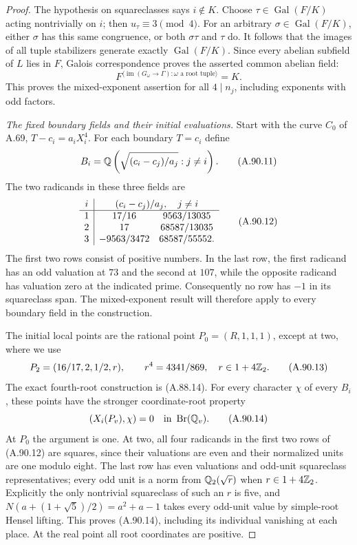 \begin{proof}
The hypothesis on squareclasses says $i\notin K$.
Choose $\tau\in\operatorname{Gal}(F/K)$ acting nontrivially
on $i$; then $u_\tau\equiv3\pmod4$.
For an arbitrary $\sigma\in\operatorname{Gal}(F/K)$,
either $\sigma$ has this same congruence, or both
$\sigma\tau$ and $\tau$ do.
It follows that the images of all tuple stabilizers
generate exactly $\operatorname{Gal}(F/K)$.
Since every abelian subfield of $L$ lies in $F$,
Galois correspondence proves the asserted common
abelian field:
\[
 F^{\langle\operatorname{im}(G_\omega\to\Gamma):
                                  \omega\text{ a root tuple}\rangle}=K .
 \tag{A.90.10}
\]
This proves the mixed-exponent assertion for all
$4\mid n_j$, including exponents with odd factors.

\emph{The fixed boundary fields and their initial evaluations.}
Start with the curve $C_0$ of A.69,
$T-c_i=a_iX_i^4$.  For each boundary $T=c_i$ define
\[
 B_i=\mathbb Q\left(\sqrt{(c_i-c_j)/a_j}:j\ne i\right).
 \tag{A.90.11}
\]
The two radicands in these three fields are
\[
 \begin{array}{c|cc}
 i&\multicolumn{2}{c}{(c_i-c_j)/a_j,\quad j\ne i}\\ \hline
 1&17/16&9563/13035\\
 2&17&68587/13035\\
 3&-9563/3472&68587/55552 .
 \end{array}
 \tag{A.90.12}
\]
The first two rows consist of positive numbers.
In the last row, the first radicand has an odd
valuation at $73$ and the second at $107$, while
the opposite radicand has valuation zero at
the indicated prime.
Consequently no row has $-1$ in its squareclass span.
The mixed-exponent result will therefore apply to
every boundary field in the construction.

The initial local points are the rational point
$P_0=(R,1,1,1)$, except at two, where we use
\[
 P_2=(16/17,2,1/2,r),\qquad
          r^4=4341/869,\quad r\in1+4\mathbb Z_2.
 \tag{A.90.13}
\]
The exact fourth-root construction is (A.88.14).
For every character $\chi$ of every $B_i$, these
points have the stronger coordinate-root property
\[
              (X_i(P_v),\chi)=0
                            \quad\text{in }\operatorname{Br}(\mathbb Q_v).
 \tag{A.90.14}
\]
At $P_0$ the argument is one.
At two, all four radicands in the first two rows of
(A.90.12) are squares, since their valuations are
even and their normalized units are one modulo eight.
The last row has even valuations and odd-unit
squareclass representatives; every odd unit is a
norm from $\mathbb Q_2(\sqrt r)$ when $r\in1+4\mathbb Z_2$.
Explicitly the only nontrivial squareclass of such
an $r$ is five, and
$N(a+(1+\sqrt5)/2)=a^2+a-1$ takes every odd-unit
value by simple-root Hensel lifting.
This proves (A.90.14), including its individual
vanishing at each place.
At the real point all root coordinates are positive.


\end{proof}
